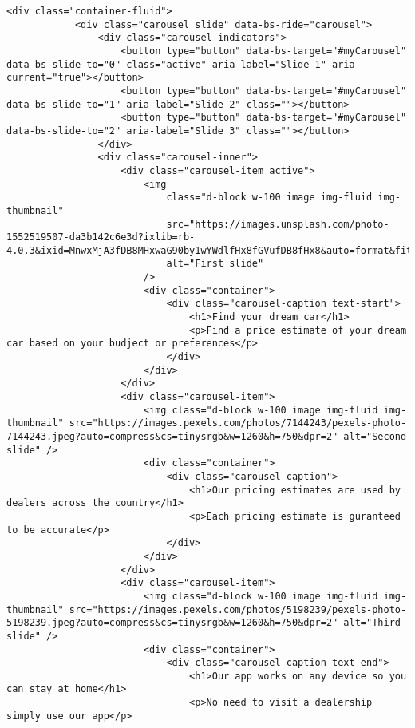 \begin{lstlisting}[style=htmlcssjs]
        <div class="container-fluid">
            <div class="carousel slide" data-bs-ride="carousel">
                <div class="carousel-indicators">
                    <button type="button" data-bs-target="#myCarousel" data-bs-slide-to="0" class="active" aria-label="Slide 1" aria-current="true"></button>
                    <button type="button" data-bs-target="#myCarousel" data-bs-slide-to="1" aria-label="Slide 2" class=""></button>
                    <button type="button" data-bs-target="#myCarousel" data-bs-slide-to="2" aria-label="Slide 3" class=""></button>
                </div>
                <div class="carousel-inner">
                    <div class="carousel-item active">
                        <img
                            class="d-block w-100 image img-fluid img-thumbnail"
                            src="https://images.unsplash.com/photo-1552519507-da3b142c6e3d?ixlib=rb-4.0.3&ixid=MnwxMjA3fDB8MHxwaG90by1wYWdlfHx8fGVufDB8fHx8&auto=format&fit=crop&w=2070&q=80"
                            alt="First slide"
                        />
                        <div class="container">
                            <div class="carousel-caption text-start">
                                <h1>Find your dream car</h1>
                                <p>Find a price estimate of your dream car based on your budject or preferences</p>
                            </div>
                        </div>
                    </div>
                    <div class="carousel-item">
                        <img class="d-block w-100 image img-fluid img-thumbnail" src="https://images.pexels.com/photos/7144243/pexels-photo-7144243.jpeg?auto=compress&cs=tinysrgb&w=1260&h=750&dpr=2" alt="Second slide" />
                        <div class="container">
                            <div class="carousel-caption">
                                <h1>Our pricing estimates are used by dealers across the country</h1>
                                <p>Each pricing estimate is guranteed to be accurate</p>
                            </div>
                        </div>
                    </div>
                    <div class="carousel-item">
                        <img class="d-block w-100 image img-fluid img-thumbnail" src="https://images.pexels.com/photos/5198239/pexels-photo-5198239.jpeg?auto=compress&cs=tinysrgb&w=1260&h=750&dpr=2" alt="Third slide" />
                        <div class="container">
                            <div class="carousel-caption text-end">
                                <h1>Our app works on any device so you can stay at home</h1>
                                <p>No need to visit a dealership simply use our app</p>

\end{lstlisting}
